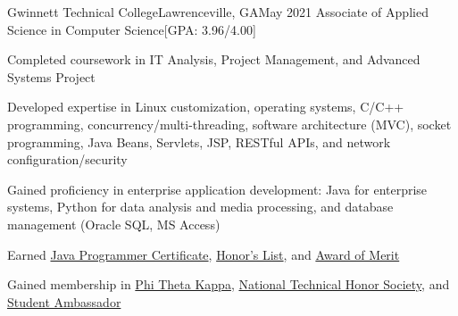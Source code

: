 \begin{resume-itemize}
  {Gwinnett Technical College}{Lawrenceville, GA}{May 2021}
  {Associate of Applied Science in Computer Science}[GPA: 3.96/4.00]
    \item Completed coursework in IT Analysis, Project Management, and Advanced Systems Project
    \item Developed expertise in Linux customization, operating systems, 
    C/C++ programming, concurrency/multi-threading, software architecture (MVC), 
    socket programming, Java Beans, Servlets, JSP, RESTful APIs, and network configuration/security
    \item Gained proficiency in enterprise application development: Java for enterprise systems, 
    Python for data analysis and media processing, and database management (Oracle SQL, MS Access)    
    \item Earned \href{https://yundaeleesong.github.io/2105-GraduateAward-JavaProgrammer.pdf}{Java Programmer Certificate}, 
    \href{https://yundaeleesong.github.io/1911-HonorsList.pdf}{Honor's List}, and 
    \href{https://yundaeleesong.github.io/2105-MeritAward.pdf}{Award of Merit}
    \item Gained membership in \href{https://yundaeleesong.github.io/1810-membership-PhiThetaKappa.pdf}{Phi Theta Kappa}, 
    \href{https://yundaeleesong.github.io/2104-membership-NTHS.pdf}{National Technical Honor Society}, 
    and \href{https://yundaeleesong.github.io/2105-membership-Ambassador.pdf}{Student Ambassador}
\end{resume-itemize}

